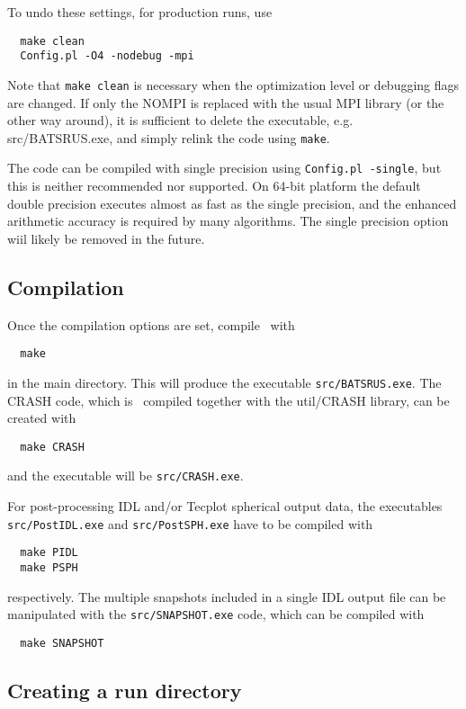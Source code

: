 To undo these settings, for production runs, use 
\begin{verbatim}
  make clean
  Config.pl -O4 -nodebug -mpi
\end{verbatim}
Note that {\tt make clean} is necessary when the optimization level 
or debugging flags are changed. If only the NOMPI is replaced with 
the usual MPI library (or the other way around), it is sufficient to
delete the executable, e.g. src/BATSRUS.exe, and simply relink the code
using {\tt make}.

The code can be compiled with single precision using {\tt Config.pl -single},
but this is neither recommended nor supported. On 64-bit platform the default
double precision executes almost as fast as the single precision, and the 
enhanced arithmetic accuracy is required by many algorithms.  
The single precision option wiil likely be removed in the future.

\subsection{Compilation}

Once the compilation options are set, compile \BATSRUS\ with
\begin{verbatim}
  make
\end{verbatim}
in the main directory. This will produce the executable 
{\tt src/BATSRUS.exe}. The CRASH code, which is \BATSRUS\
compiled together with the util/CRASH library, can be created with
\begin{verbatim}
  make CRASH
\end{verbatim}
and the executable will be {\tt src/CRASH.exe}. 

For post-processing IDL and/or 
Tecplot spherical output data, 
the executables {\tt src/PostIDL.exe} and {\tt src/PostSPH.exe} 
have to be compiled with 
\begin{verbatim}
  make PIDL
  make PSPH
\end{verbatim}
respectively.
The multiple snapshots included in a single IDL output file can be 
manipulated with the {\tt src/SNAPSHOT.exe} code, 
which can be compiled with
\begin{verbatim}
  make SNAPSHOT
\end{verbatim}

\subsection{Creating a run directory}

